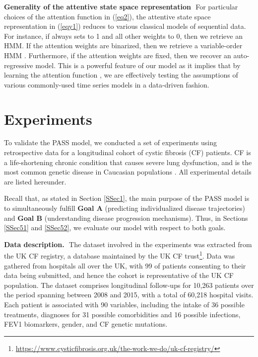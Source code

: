 \documentclass[twoside,11pt]{article}
\begin{document}
{\bf Generality of the attentive state space representation}\,\, For particular choices of the attention function in (\ref{eq2}), the attentive state space representation in (\ref{eqy1}) reduces to various classical models of sequential data. For instance, if \mbox{\footnotesize } always sets \mbox{\footnotesize } to 1 and all other weights to 0, then we retrieve an HMM. If the attention weights are binarized, then we retrieve a variable-order HMM \cite{willems1995context, begleiter2004prediction}. Furthermore, if the attention weights are fixed, then we recover an auto-regressive model. This is a powerful feature of our model as it implies that by learning the attention function \mbox{\footnotesize }, we are effectively testing the assumptions of various commonly-used time series models in a data-driven fashion.

\section{Experiments}
\label{Sec5}
To validate the PASS model, we conducted a set of experiments using retrospective data for a longitudinal cohort of cystic fibrosis (CF) patients. CF is a life-shortening chronic condition that causes severe lung dysfunction, and is the most common genetic disease in Caucasian populations \cite{szczesniak2017phenotypes}. All experimental details are listed hereunder. 

Recall that, as stated in Section \ref{SSec1}, the main purpose of the PASS model is to simultaneously fulfill {\bf Goal A} (predicting individualized disease trajectories) and {\bf Goal B} (understanding disease progression mechanisms). Thus, in Sections \ref{SSec51} and \ref{SSec52}, we evaluate our model with respect to both goals.

{\bf Data description.}\,\, The dataset involved in the experiments was extracted from the UK CF registry, a database maintained by the UK CF trust\footnote{\url{https://www.cysticfibrosis.org.uk/the-work-we-do/uk-cf-registry/}}. Data was gathered from hospitals all over the UK, with 99 of patients consenting to their data being submitted, and hence the cohort is representative of the UK CF population. The dataset comprises longitudinal follow-ups for 10,263 patients over the period spanning between 2008 and 2015, with a total of 60,218 hospital visits. Each patient is associated with 90 variables, including the intake of 36 possible treatments, diagnoses for 31 possible comorbidities and 16 possible infections, FEV1 biomarkers, gender, and CF genetic mutations. 
\end{document}
